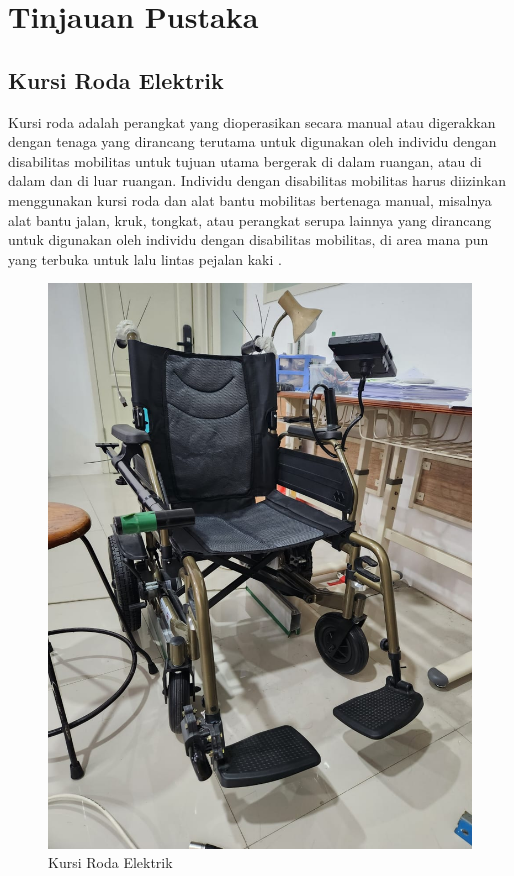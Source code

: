 \section{Tinjauan Pustaka}
\label{sec:tinjauanpustaka}

\subsection{Kursi Roda Elektrik}
Kursi roda adalah perangkat yang dioperasikan secara manual atau digerakkan dengan tenaga yang dirancang terutama untuk digunakan oleh individu dengan disabilitas mobilitas untuk tujuan utama bergerak di dalam ruangan, atau di dalam dan di luar ruangan.  Individu dengan disabilitas mobilitas harus diizinkan menggunakan kursi roda dan alat bantu mobilitas bertenaga manual, misalnya alat bantu jalan, kruk, tongkat, atau perangkat serupa lainnya yang dirancang untuk digunakan oleh individu dengan disabilitas mobilitas, di area mana pun yang terbuka untuk lalu lintas pejalan kaki \cite{ADA_2023}.

\begin{figure}[ht]
  \centering

  \includegraphics[scale=0.1]{gambar/bab3/kursi.jpeg}

  \caption{Kursi Roda Elektrik}
  \label{fig:kursiroda}
\end{figure}